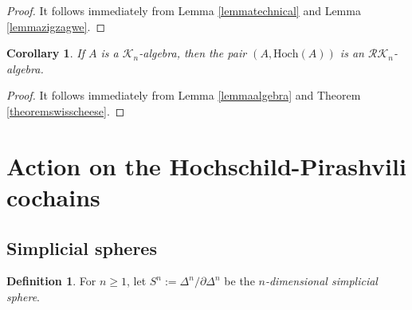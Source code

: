 \documentclass[]{amsart}
\newtheorem{corollary}[theorem]{Corollary}
\theoremstyle{definition}
\newtheorem{definition}[theorem]{Definition}
\begin{document}
\begin{proof}
	It follows immediately from Lemma \ref{lemmatechnical} and Lemma \ref{lemmazigzagwe}.
\end{proof}

\begin{corollary}\label{corollaswisscheeseaction}
	If $A$ is a $\mathcal{K}_n$-algebra, then the pair $(A,\mathrm{Hoch}(A))$ is an $\mathcal{RK}_n$-algebra.
\end{corollary}

\begin{proof}
	It follows immediately from Lemma \ref{lemmaalgebra} and Theorem \ref{theoremswisscheese}.
\end{proof}

\section{Action on the Hochschild-Pirashvili cochains}\label{sectionhochschildpirashvili}

\subsection{Simplicial spheres}

\begin{definition}
	For $n \geq 1$, let $S^n := \Delta^n / \partial \Delta^n$ be the \emph{$n$-dimensional simplicial sphere}.
\end{definition}
\end{document}
